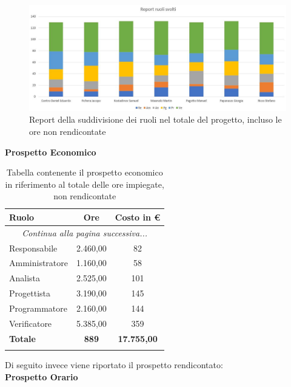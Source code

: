 \documentclass[../piano_di_progetto.tex]{subfiles}
\begin{document}
\begin{figure}[H]
\centering
\includegraphics[width=12cm]{img/report_ruoli_tot}
\caption{Report della suddivisione dei ruoli nel totale del progetto, incluso le ore non rendicontate}
\end{figure}

\textbf{Prospetto Economico}

\begin{center}
	\begin{longtable}{|l|c|c|}
		\hline
		\rowcolor{lightgray}
		\textbf{Ruolo} & \textbf{Ore} & \textbf{Costo in €}\\
		\hline
		\endhead
		
		\hline
		\multicolumn{3}{|c|}{\emph{Continua alla pagina successiva...}}\\
		\hline
		\endfoot

		\endlastfoot
		
		Responsabile & 2.460,00 & 82 \\
		Amministratore & 1.160,00 & 58 \\
		Analista & 2.525,00 & 101 \\
		Progettista & 3.190,00 & 145 \\
		Programmatore & 2.160,00 & 144 \\
		Verificatore & 5.385,00 & 359 \\
		\hline
		\textbf{Totale} & \textbf{889} & \textbf{17.755,00}\\
		\hline

		\caption{Tabella contenente il prospetto economico in riferimento al totale delle ore impiegate, non rendicontate}
	\end{longtable}
\end{center}


Di seguito invece viene riportato il prospetto rendicontato:\\

\textbf{Prospetto Orario}
\end{document}
